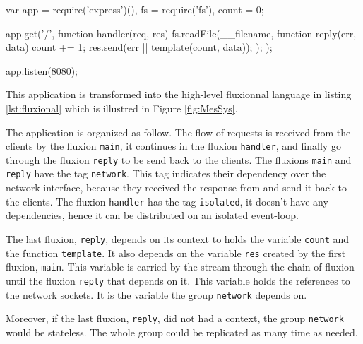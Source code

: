 \begin{code}[js,
  caption={Example web application},
  label={lst:source}]
var app = require('express')(),
    fs = require('fs'),
    count = 0;

app.get('/', function handler(req, res){
  fs.readFile(__filename, function reply(err, data) {
    count += 1;
    res.send(err || template(count, data));
  });
});

app.listen(8080);
\end{code}

This application is transformed into the high-level fluxionnal language in listing \ref{lst:fluxional} which is illustred in Figure \ref{fig:MesSys}.


The application is organized as follow.
The flow of requests is received from the clients by the fluxion \texttt{main}, it continues in the fluxion \texttt{handler}, and finally go through the fluxion \texttt{reply} to be send back to the clients.
The fluxions \texttt{main} and \texttt{reply} have the tag \texttt{network}.
This tag indicates their dependency over the network interface, because they  received the response from and send it back to the clients.
The fluxion \texttt{handler} has the tag \texttt{isolated}, it doesn't have any dependencies, hence it can be distributed on an isolated event-loop.

The last fluxion, \texttt{reply}, depends on its context to holds the variable \texttt{count} and the function \texttt{template}.
It also depends on the variable \texttt{res} created by the first fluxion, \texttt{main}.
This variable is carried by the stream through the chain of fluxion until the fluxion \texttt{reply} that depends on it.
This variable holds the references to the network sockets.
It is the variable the group \texttt{network} depends on.

Moreover, if the last fluxion, \texttt{reply}, did not had a context, the group \texttt{network} would be stateless.
The whole group could be replicated as many time as needed. %

